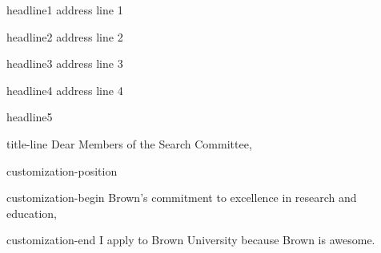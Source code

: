 headline1%
address line 1

headline2%
address line 2

headline3%
address line 3

headline4%
address line 4

headline5%
\vspace{-4pt}


title-line%
Dear Members of the Search Committee,

customization-position%
{}

customization-begin%
Brown's commitment to excellence in research and education, 

customization-end%
I apply to Brown University because Brown is awesome.


